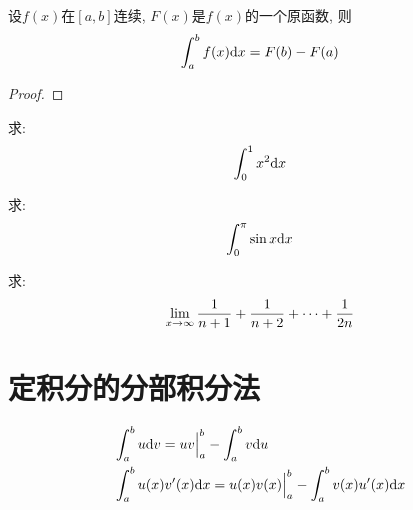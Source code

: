 \begin{solution}
    
\end{solution}

\begin{theorem}[微积分基本定理]
    设$f(x)$在$[a, b]$连续, $F(x)$是$f(x)$的一个原函数, 则
    \begin{equation*}
        \int_a^b f(x)\mathrm{d} x = F(b) - F(a)
    \end{equation*}
\end{theorem}
\begin{proof}
    
\end{proof}

\begin{example}
    求:
    \begin{equation*}
        \int_{0}^{1}x^2 \mathrm{d} x
    \end{equation*}
\end{example}
\begin{solution}
    
\end{solution}

\begin{example}
    求:
    \begin{equation*}
        \int_0^\pi \sin x \mathrm{d} x
    \end{equation*}
\end{example}
\begin{solution}
    
\end{solution}

\begin{example}
    求:
    \begin{equation*}
        \def\tmp{\frac{1}{n+1}+\frac{1}{n+2}+\cdots+\frac{1}{2n}}
        \funclim{x}{\infty}{\tmp}
    \end{equation*}
\end{example}
\begin{solution}
    
\end{solution}

\section{定积分的分部积分法}
\begin{align}
    &\int_a^b u \mathrm{d} v = uv\Big|_a^b -\int_a^b v \mathrm{d} u \\
    &\int_a^b u(x)v'(x) \mathrm{d} x = u(x)v(x)\Big|_a^b -\int_a^b v(x)u'(x) \mathrm{d} x
\end{align}

